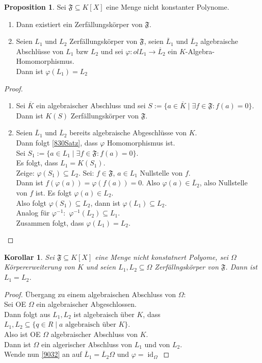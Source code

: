\documentclass[10pt,a4paper]{article}
\newcommand{\ol}[1]{\overline{#1}}
\newcommand{\id}{\operatorname{id}}
\newcounter{thm}[section]
\theoremstyle{definition}
\newtheorem{prop}[thm]{Proposition}
\theoremstyle{plain}
\newtheorem{kor}[thm]{Korollar}
\theoremstyle{remark}
\begin{document}
\begin{prop}
	Sei $\mathfrak F\subseteq K[X]$ eine Menge nicht konstanter Polynome.
	\begin{enumerate}
		\item Dann existiert ein Zerfällungskörper von $\mathfrak F$.
		\item Seien $L_1$ und $L_2$ Zerfällungskörper von $\mathfrak F$, seien $\ol L_1$ und $\ol L_2$ algebraische Abschlüsse von $L_1$ bzw $L_2$ und sei $\varphi:ol L_1\rightarrow \ol L_2$ ein $K$-Algebra-Homomorphismus.\\
		Dann ist $\varphi(L_1)=L_2$
	\end{enumerate}
\end{prop}
\begin{proof}
	\begin{enumerate}
		\item Sei $\ol K$ ein algebraischer Abschluss und sei $S:=\{a\in \ol K\mid \exists f\in \mathfrak F:f(a)=0\}$.\\
		Dann ist $K(S)$ Zerfällungskörper von $\mathfrak F$.
		\item Seien $\ol L_1$ und $\ol L_2$ bereits algebraische Abgeschlüsse von $K$.\\
		Dann folgt \ref{830Satz}, dass $\varphi$ Homomorphismus ist.\\
		Sei $S_1:=\{a\in L_1\mid\exists f\in\mathfrak F: f(a)=0 \}$.\\
		Es folgt, dass $L_1=K(S_1)$.\\
		Zeige: $\varphi(S_1)\subseteq L_2$. Sei: $f\in\mathfrak F$, $a\in L_1$ Nullstelle von $f$.\\
		Dann ist $f(\varphi(a))=\varphi(f(a))=0$. Also $\varphi(a)\in\ol L_2$, also Nullstelle von $f$ ist. Es folgt $\varphi(a)\in L_2$.\\
		Also folgt $\varphi(S_1)\subseteq L_2$, dann ist $\varphi(L_1)\subseteq L_2$.\\
		Analog für $\varphi^{-1}:$ $\varphi^{-1}(L_2)\subseteq L_1$.\\
		Zusammen folgt, dass $\varphi(L_1)=L_2$.
	\end{enumerate}
\end{proof}

\begin{kor}
	Sei $\mathfrak F\subseteq K[X]$ eine Menge nicht konstatnert Polyome, sei $\Omega$ Körpererweiterung von $K$ und seien $L_1,L_2\subseteq\Omega$ Zerfällngskörper von $\mathfrak F$. Dann ist $L_1=L_2$.
\end{kor}
\begin{proof}
	Übergang zu einem algebraischen Abschluss  von $\Omega$:\\
	Sei OE $\Omega$ ein algebraischer Abgeschlossen.\\
	Dann folgt aus $L_1,L_2$ ist algebraisch über $K$, dass $L_1,L_2\subseteq \{q\in R\mid \text{$a$ algebraisch über $K$}\}$.\\
	Also ist OE $\Omega$ algebraischer Abschluss von $K$.\\
	Dann ist $\Omega$ ein algerischer Abschluss von $L_1$ und von $L_2$.\\
	Wende nun \ref{9032} an auf $\ol L_1=\ol L_2\Omega$ und $\varphi=\id_{\Omega}$
\end{proof}
\end{document}

